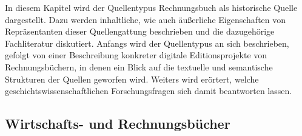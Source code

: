 \documentclass[12pt,a4paper]{article}
\begin{document}
In diesem Kapitel wird der Quellentypus Rechnungsbuch als historische Quelle dargestellt. Dazu werden inhaltliche, wie auch äußerliche Eigenschaften von Repräsentanten dieser Quellengattung beschrieben und die dazugehörige Fachliteratur diskutiert.
Anfangs wird der Quellentypus an sich beschrieben, gefolgt von einer Beschreibung konkreter digitale Editionsprojekte von Rechnungsbüchern, in denen ein Blick auf die textuelle und semantische Strukturen der Quellen geworfen wird. Weiters wird erörtert, welche geschichtswissenschaftlichen Forschungsfragen sich damit beantworten lassen.

\subsection{Wirtschafts- und Rechnungsbücher}
\end{document}
